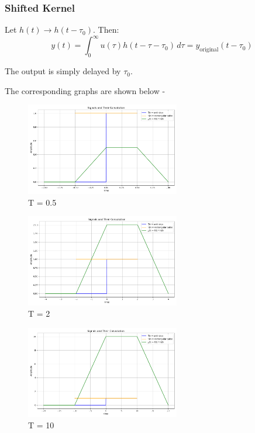 \subsubsection{Shifted Kernel}
Let \( h(t) \rightarrow h(t - \tau_0) \). Then:
\[
y(t) = \int_0^\infty u(\tau) h(t - \tau - \tau_0) \, d\tau = y_{\text{original}}(t - \tau_0)
\]

The output is simply delayed by \( \tau_0 \).

The corresponding graphs are shown below - \\
\begin{figure}[h]
    \centering
    \includegraphics[width=0.6\textwidth]{figs/t_0.5.png}
    \caption{T = 0.5}
    \label{fig:t_0.5.png}
\end{figure}
\begin{figure}[h]
    \centering
    \includegraphics[width=0.6\textwidth]{figs/t_2.png}
    \caption{T = 2}
    \label{fig:conv_sinc}
\end{figure}
\begin{figure}[h]
    \centering
    \includegraphics[width=0.6\textwidth]{figs/t_10.png}
    \caption{T = 10}
    \label{fig:conv_sinc}
\end{figure}

\newpage
